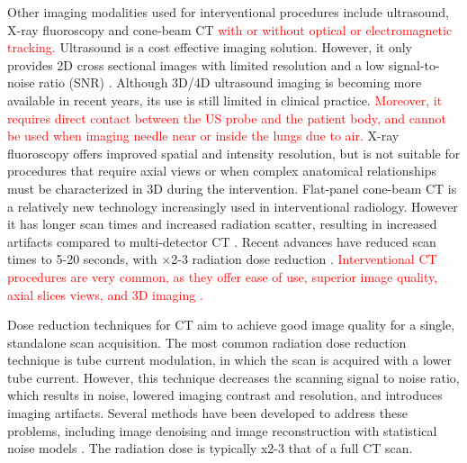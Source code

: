 Other imaging modalities used for interventional procedures include ultrasound, X-ray fluoroscopy and cone-beam CT \textcolor{red}{with or without optical or electromagnetic tracking.}
Ultrasound is a cost effective imaging solution. However, it only provides 2D cross sectional images with limited resolution and a low signal-to-noise ratio (SNR) \cite{sheafor2000comparison}. Although 3D/4D ultrasound imaging is becoming more available in recent years, its use is still limited in clinical practice. \textcolor{red}{Moreover, it requires direct contact between the US probe and the patient body, and cannot be used when imaging needle near or inside the lungs due to air.}
X-ray fluoroscopy offers improved spatial and intensity resolution, but is not suitable for procedures that require axial views or when complex anatomical relationships must be characterized in 3D during the intervention.
Flat-panel cone-beam CT is a relatively new technology increasingly used in interventional radiology. However it has longer scan times and increased radiation scatter, resulting in increased artifacts compared to multi-detector CT \cite{orth2008cbct}. Recent advances have reduced scan times to 5-20 seconds, with $\times$2-3 radiation dose reduction \cite{dynact}.
\textcolor{red}{Interventional CT procedures are very common, as they offer ease of use, superior image quality, axial slices views, and 3D imaging \cite{gupta2014ct}.}

Dose reduction techniques for CT aim to achieve good image quality for a single, standalone scan acquisition. The most common radiation dose reduction technique is tube current modulation, in which the scan is acquired with a lower tube current. However, this technique decreases the scanning signal to noise ratio, which results in noise, lowered imaging contrast and resolution, and introduces imaging artifacts. Several methods have been developed to address these problems, including image denoising \cite{manduca2009projection} and image reconstruction with statistical noise models  \cite{zhang2016statistical,kim2015sparseview,niu2014sparse,liu2014total}. The radiation dose is typically x2-3 that of a full CT scan. 

